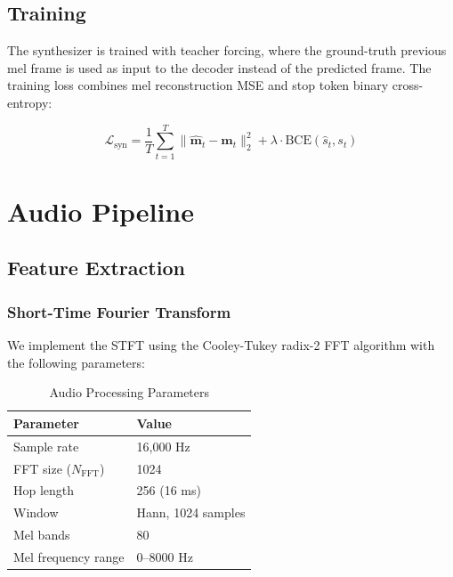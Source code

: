\documentclass[conference]{IEEEtran}
\begin{document}
\subsection{Training}

The synthesizer is trained with teacher forcing, where the ground-truth previous mel frame is used as input to the decoder instead of the predicted frame. The training loss combines mel reconstruction MSE and stop token binary cross-entropy:

\begin{equation}
\mathcal{L}_{\text{syn}} = \frac{1}{T}\sum_{t=1}^{T} \|\hat{\mathbf{m}}_t - \mathbf{m}_t\|_2^2 + \lambda \cdot \text{BCE}(\hat{s}_t, s_t)
\end{equation}

\section{Audio Pipeline}

\subsection{Feature Extraction}

\subsubsection{Short-Time Fourier Transform}

We implement the STFT using the Cooley-Tukey radix-2 FFT algorithm \cite{cooley1965fft} with the following parameters:

\begin{table}[htbp]
\caption{Audio Processing Parameters}
\label{tab:audio_params}
\centering
\begin{tabular}{@{}ll@{}}
\toprule
\textbf{Parameter} & \textbf{Value} \\
\midrule
Sample rate & 16,000 Hz \\
FFT size ($N_{\text{FFT}}$) & 1024 \\
Hop length & 256 (16 ms) \\
Window & Hann, 1024 samples \\
Mel bands & 80 \\
Mel frequency range & 0--8000 Hz \\
\bottomrule
\end{tabular}
\end{table}
\end{document}
